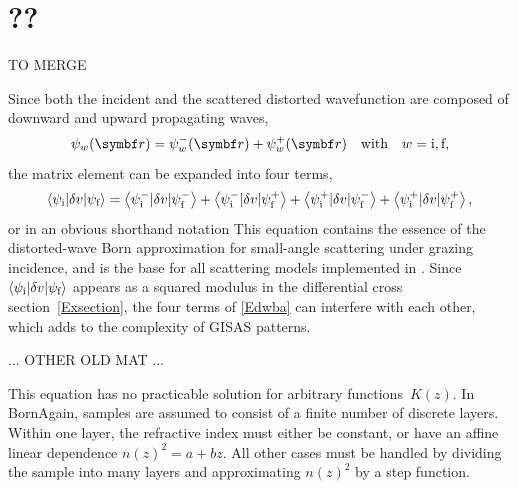 \section{??}

TO MERGE

Since both the incident
and the scattered distorted wavefunction
are composed of downward and upward propagating waves,
\begin{equation}\label{Epsipm}
  \psi_w(\r)
  = \psi^-_w(\r) + \psi^+_w(\r)
  \quad\text{with}\quad
  w=\ti,\tf,
\end{equation}
%
the matrix element can be expanded into four terms,
\begin{equation}\label{Edwba4}
  \left\langle \psi_{\text{i}}|\delta v|\psi_{\text{f}}\right\rangle
  = \left\langle \psi^-_{\text{i}}|\delta v|\psi^-_{\text{f}}\right\rangle
  + \left\langle \psi^-_{\text{i}}|\delta v|\psi^+_{\text{f}}\right\rangle
  + \left\langle \psi^+_{\text{i}}|\delta v|\psi^-_{\text{f}}\right\rangle
  + \left\langle \psi^+_{\text{i}}|\delta v|\psi^+_{\text{f}}\right\rangle,
\end{equation}
%
%
or in an obvious shorthand notation
This equation contains the essence of
the distorted-wave Born approximation
for small-angle scattering under grazing incidence,
and is the base for all scattering models implemented in \BornAgain.
Since $\left\langle \psi_{\text{i}}|\delta v|\psi_{\text{f}}\right\rangle$
appears as a squared modulus
in the differential cross section~\cref{Exsection},
the four terms of \cref{Edwba} can interfere with each other,
which adds to the complexity of GISAS patterns.

... OTHER OLD MAT ...

%
%
%
This equation has no practicable solution for arbitrary functions~$K(z)$.
In BornAgain, samples are assumed to consist of a finite number of discrete layers.
%
%
Within one layer, the refractive index must either be constant,
or have an affine linear dependence $n(z)^2=a+bz$.
All other cases must be handled by dividing the sample into many layers
and approximating $n(z)^2$ by a step function.

